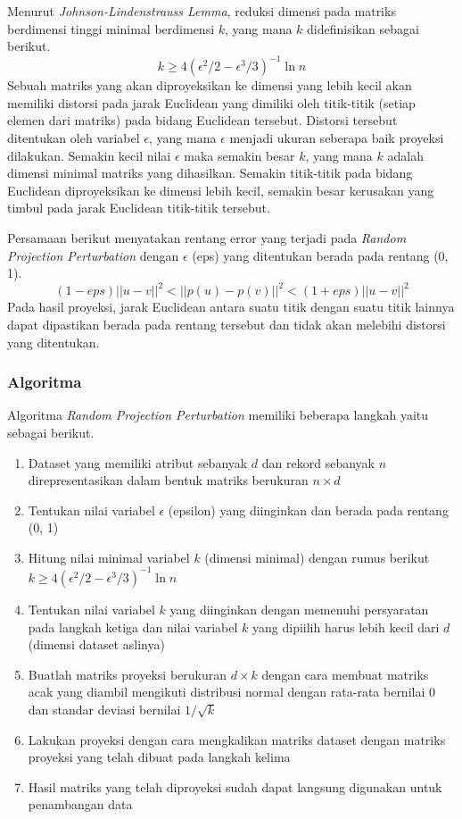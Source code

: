 Menurut \textit{Johnson-Lindenstrauss Lemma}, reduksi dimensi pada matriks berdimensi tinggi minimal berdimensi \(k\), yang mana \(k\) didefinisikan sebagai berikut.
\begin{equation}
	k \geq 4(\epsilon^{2}/2-\epsilon^{3}/3)^{-1}\ln{n}
\end{equation}
Sebuah matriks yang akan diproyeksikan ke dimensi yang lebih kecil akan memiliki distorsi pada jarak Euclidean yang dimiliki oleh titik-titik (setiap elemen dari matriks) pada bidang Euclidean tersebut. Distorsi tersebut ditentukan oleh variabel \(\epsilon\), yang mana \(\epsilon\) menjadi ukuran seberapa baik proyeksi dilakukan. Semakin kecil nilai \(\epsilon\) maka semakin besar \(k\), yang mana \(k\) adalah dimensi minimal matriks yang dihasilkan. Semakin titik-titik pada bidang Euclidean diproyeksikan ke dimensi lebih kecil, semakin besar kerusakan yang timbul pada jarak Euclidean titik-titik tersebut.

Persamaan berikut menyatakan rentang error yang terjadi pada \textit{Random Projection Perturbation} dengan \(\epsilon\) (eps) yang ditentukan berada pada rentang (0, 1). 
\begin{equation}
	(1-eps)||u - v||^{2}<||p(u) - p(v)||^{2}<(1+eps)||u - v||^{2}
\end{equation}
Pada hasil proyeksi, jarak Euclidean antara suatu titik dengan suatu titik lainnya dapat dipastikan berada pada rentang tersebut dan tidak akan melebihi distorsi yang ditentukan.

\subsubsection{Algoritma}
\label{subsubsec:algo-projection}

Algoritma \textit{Random Projection Perturbation} memiliki beberapa langkah yaitu sebagai berikut.
\begin{enumerate}
    \item Dataset yang memiliki atribut sebanyak \(d\) dan rekord sebanyak \(n\) direpresentasikan dalam bentuk matriks berukuran \(n \times d\)
    \item Tentukan nilai variabel \(\epsilon\) (epsilon) yang diinginkan dan berada pada rentang (0, 1)
    \item Hitung nilai minimal variabel \(k\) (dimensi minimal) dengan rumus berikut \(k \geq 4(\epsilon^{2}/2-\epsilon^{3}/3)^{-1}\ln{n}\)
    \item Tentukan nilai variabel \(k\) yang diinginkan dengan memenuhi persyaratan pada langkah ketiga dan nilai variabel \(k\) yang dipiilih harus lebih kecil dari \(d\) (dimensi dataset aslinya)
    \item Buatlah matriks proyeksi berukuran \(d \times k\) dengan cara membuat matriks acak yang diambil mengikuti distribusi normal dengan rata-rata bernilai 0 dan standar deviasi bernilai \(1/\sqrt{k}\)
    \item Lakukan proyeksi dengan cara mengkalikan matriks dataset dengan matriks proyeksi yang telah dibuat pada langkah kelima
    \item Hasil matriks yang telah diproyeksi sudah dapat langsung digunakan untuk penambangan data
\end{enumerate}

